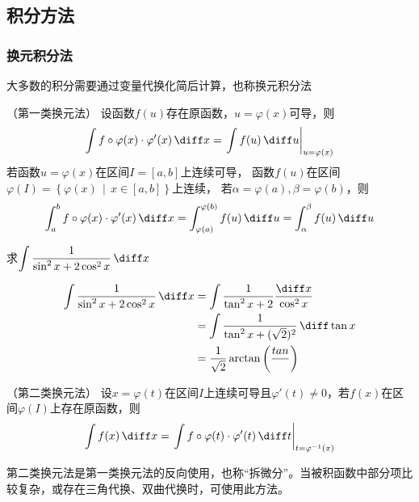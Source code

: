 \subsection{积分方法}
\subsubsection{换元积分法}
大多数的积分需要通过变量代换化简后计算，也称换元积分法
\begin{theorem}
    （第一类换元法）
    设函数$f(u)$存在原函数，$u=\varphi(x)$可导，则
    \[ \int f\circ\varphi(x)\cdot \varphi'(x)\,\diff x = \left.\int f(u)\,\diff u\right\vert_{u=\varphi(x)} \]
    若函数$u=\varphi(x)$在区间$I=[a,b]$上连续可导，
    函数$f(u)$在区间$\varphi(I)=\left\{\varphi(x) \,\middle|\, x\in[a,b]\right\}$上连续，
    若$\alpha=\varphi(a),\beta=\varphi(b)$，则
    \[
        \int_a^b f\circ\varphi(x)\cdot\varphi'(x)\,\diff x
        =
        \int_{\varphi(a)}^{\varphi(b)} f(u)\,\diff u
        =
        \int_\alpha^\beta f(u)\,\diff u
    \]
\end{theorem}

\begin{example}
    求$\displaystyle\int \frac{1}{\sin^2x + 2\cos^2x}\,\diff x$
\end{example}
\begin{solution}
    \begin{align*}
        \int \frac{1}{\sin^2x + 2\cos^2x}\,\diff x
         & = \int \frac{1}{\tan^2x + 2}\frac{\diff x}{\cos^2x}    \\
         & = \int \frac{1}{\tan^2x + (\sqrt{2})^2} \,\diff \tan x \\
         & = \frac{1}{\sqrt{2}}\arctan\left(\frac{tan}{}\right)
    \end{align*}
\end{solution}


\begin{theorem}
    （第二类换元法）
    设$x=\varphi(t)$在区间$I$上连续可导且$\varphi'(t)\neq 0$，若$f(x)$在区间$\varphi(I)$上存在原函数，则
    \[ \int f(x)\,\diff x = \left.\int f\circ\varphi(t)\cdot\varphi'(t)\,\diff t\right\vert_{t=\varphi^{-1}(x)} \]
\end{theorem}
\begin{situation}
    第二类换元法是第一类换元法的反向使用，也称“拆微分”。当被积函数中部分项比较复杂，或存在三角代换、双曲代换时，可使用此方法。
\end{situation}


